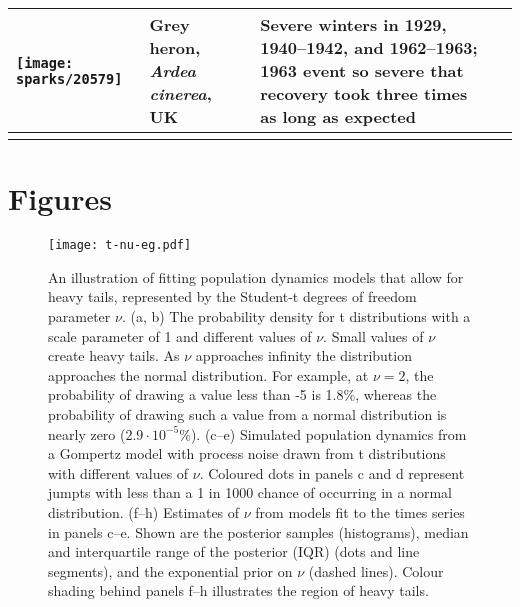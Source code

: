 \documentclass[12pt]{article}
\begin{document}
\begin{small}
\begin{longtable}{>{\RaggedRight}m{2.0cm}>{\RaggedRight}p{3.0cm}>{\RaggedRight}p{7.0cm}>{\RaggedRight}p{2.0cm}}
\texttt{[image: sparks/20579]} &
Grey heron,
\textit{Ardea cinerea},
UK &
Severe winters in 1929, 1940--1942, and 1962--1963; 1963 event so severe that recovery took three times as long as expected &
\citep{stafford1971} \\





\bottomrule
\label{tab:sparks}
\end{longtable}
\end{small}



\section{Figures}

\begin{figure}[htbp]
\begin{center}
\texttt{[image: t-nu-eg.pdf]}
\caption{An illustration of fitting population dynamics models that allow for heavy tails, represented by the Student-t degrees of freedom parameter $\nu$.
  (a, b) The probability density for t distributions with a scale parameter of 1 and different values of $\nu$.
  Small values of $\nu$ create heavy tails.
  As $\nu$ approaches infinity the distribution approaches the normal distribution.
  For example, at $\nu = 2$, the probability of drawing a value less than -5 is 1.8\%, whereas the probability of drawing such a value from a normal distribution is nearly zero ($2.9\cdot10^{-5}$\%).
  (c--e) Simulated population dynamics from a Gompertz model with process noise drawn from t distributions with different values of $\nu$.
  Coloured dots in panels c and d represent jumpts with less than a 1 in 1000 chance of occurring in a normal distribution.
  (f--h) Estimates of $\nu$ from models fit to the times series in panels c--e.
  Shown are the posterior samples (histograms), median and interquartile range of the posterior (IQR) (dots and line segments), and the exponential prior on $\nu$ (dashed lines).
  Colour shading behind panels f--h illustrates the region of heavy tails.}
\label{fig:didactic}
\end{center}
\end{figure}
\end{document}
